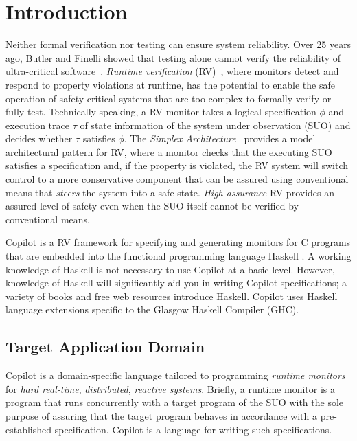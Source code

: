
\section{Introduction} \label{sec:introduction}


Neither formal verification nor testing can ensure system reliability.
%
Over 25 years ago, Butler and Finelli showed that testing alone cannot verify
the reliability of ultra-critical software~\cite{butler}.
%
\emph{Runtime verification} (RV)~\cite{monitors}, where monitors detect and
respond to property violations at runtime, has the potential to enable the safe
operation of safety-critical systems that are too complex to formally verify or
fully test.
%
Technically speaking, a RV monitor takes a logical specification $\phi$ and
execution trace $\tau$ of state information of the system under observation
(SUO) and decides whether $\tau$ satisfies $\phi$.
%
The \emph{Simplex Architecture}~\cite{simplex} provides a model architectural
pattern for RV, where a monitor checks that the executing SUO satisfies a
specification and, if the property is violated, the RV system will switch
control to a more conservative component that can be assured using conventional
means that \emph{steers} the system into a safe state.
%
\emph{High-assurance} RV provides an assured level of safety even when the SUO
itself cannot be verified by conventional means.

Copilot is a RV framework for specifying and generating monitors for C programs
that are embedded into the functional programming language Haskell
\cite{PeytonJones02}.
%
 A working knowledge of Haskell is not necessary to use Copilot at a basic
level.
%
 However, knowledge of Haskell will significantly aid you in writing Copilot
specifications;  a variety of books and free web resources introduce Haskell.
%
  Copilot uses Haskell language extensions specific to the Glasgow Haskell
Compiler (GHC).

\subsection{Target Application Domain} \label{domain}


Copilot is a domain-specific language tailored to programming \emph{runtime
monitors} for \emph{hard real-time}, \emph{distributed}, \emph{reactive
systems}.
%
Briefly, a runtime monitor is a program that runs concurrently with a target
program of the SUO with the sole purpose of assuring that the target program
behaves in accordance with a pre-established specification.
%
 Copilot is a language for writing such specifications.
%

